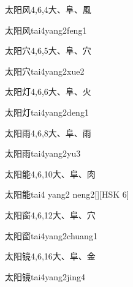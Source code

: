 \begin{Entry}{太阳风}{4,6,4}{⼤、⾩、⾵}
  \begin{Phonetics}{太阳风}{tai4yang2feng1}
  \end{Phonetics}
\end{Entry}

\begin{Entry}{太阳穴}{4,6,5}{⼤、⾩、⽳}
  \begin{Phonetics}{太阳穴}{tai4yang2xue2}
  \end{Phonetics}
\end{Entry}

\begin{Entry}{太阳灯}{4,6,6}{⼤、⾩、⽕}
  \begin{Phonetics}{太阳灯}{tai4yang2deng1}
  \end{Phonetics}
\end{Entry}

\begin{Entry}{太阳雨}{4,6,8}{⼤、⾩、⾬}
  \begin{Phonetics}{太阳雨}{tai4yang2yu3}
  \end{Phonetics}
\end{Entry}

\begin{Entry}{太阳能}{4,6,10}{⼤、⾩、⾁}
  \begin{Phonetics}{太阳能}{tai4 yang2 neng2}[][HSK 6]
  \end{Phonetics}
\end{Entry}

\begin{Entry}{太阳窗}{4,6,12}{⼤、⾩、⽳}
  \begin{Phonetics}{太阳窗}{tai4yang2chuang1}
  \end{Phonetics}
\end{Entry}

\begin{Entry}{太阳镜}{4,6,16}{⼤、⾩、⾦}
  \begin{Phonetics}{太阳镜}{tai4yang2jing4}
  \end{Phonetics}
\end{Entry}

